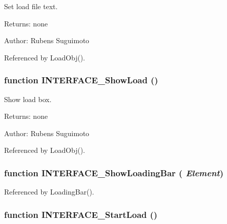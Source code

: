 Set load file text. 

\begin{Desc}
\item[Returns:]none \end{Desc}
\begin{Desc}
\item[Author:]Rubens Suguimoto \end{Desc}


Referenced by LoadObj().
\subsubsection[INTERFACE\_\-ShowLoad]{\setlength{\rightskip}{0pt plus 5cm}function INTERFACE\_\-ShowLoad ()}\label{interface_2load_8js_e0ca5b0a23d174f07d4363a875fd49f5}


Show load box. 

\begin{Desc}
\item[Returns:]none \end{Desc}
\begin{Desc}
\item[Author:]Rubens Suguimoto \end{Desc}


Referenced by LoadObj().
\subsubsection[INTERFACE\_\-ShowLoadingBar]{\setlength{\rightskip}{0pt plus 5cm}function INTERFACE\_\-ShowLoadingBar ( {\em Element})}\label{interface_2load_8js_34992ca66712969e1e8b3704875c3a28}




Referenced by LoadingBar().
\subsubsection[INTERFACE\_\-StartLoad]{\setlength{\rightskip}{0pt plus 5cm}function INTERFACE\_\-StartLoad ()}\label{interface_2load_8js_a24aa832435532fae0fa3c9b2a8c1ac1}


